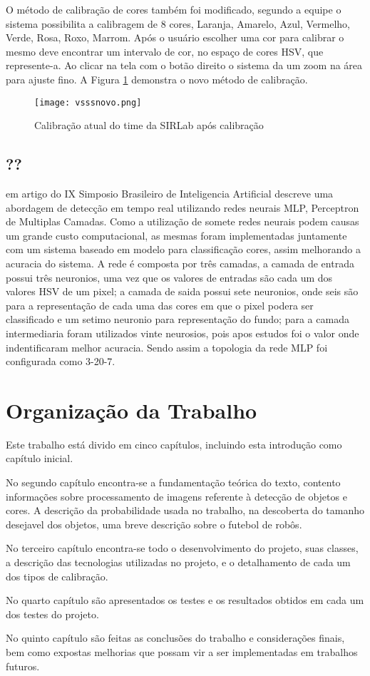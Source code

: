 O método de calibração de cores também foi modificado, segundo a equipe\cite{VSSVision} o sistema possibilita a calibragem de 8 cores, Laranja, Amarelo, Azul, Vermelho, Verde, Rosa, Roxo, Marrom. Após o usuário escolher uma cor para calibrar o mesmo deve encontrar um intervalo de cor, no espaço de cores HSV, que represente-a. Ao clicar na tela com o botão direito o sistema da um zoom na área para ajuste fino. A Figura \ref{SIRLabNovaCalibracao} demonstra o novo método de calibração.

\begin{figure}[!h]
	\centering
	\texttt{[image: vsssnovo.png]} 	
	\caption{Calibração atual do time da SIRLab \cite{VSSVision} após calibração}
	\label{SIRLabNovaCalibracao}
\end{figure}

\subsection{??}
\cite{Neura:2009} em artigo do IX Simposio Brasileiro de Inteligencia Artificial descreve uma abordagem de detecção em tempo real utilizando redes neurais MLP, Perceptron de Multiplas Camadas. Como a utilização de somete redes neurais podem causas um grande custo computacional, as mesmas foram implementadas juntamente com um sistema baseado em modelo para classificação cores, assim melhorando a acuracia do sistema.
A rede é composta por três camadas, a camada de entrada possui três neuronios, uma vez que os valores de entradas são cada um dos valores HSV de um pixel; a camada de saida possui sete neuronios, onde seis são para a representação de cada uma das cores em que o pixel podera ser classificado e um setimo neuronio para representação do fundo; para a camada intermediaria foram utilizados vinte neurosios, pois apos estudos foi o valor onde indentificaram melhor acuracia. Sendo assim a topologia da rede MLP foi configurada como  3-20-7.


\section{Organização da Trabalho} \label{Sec:Organizacao}

Este trabalho está divido em cinco capítulos, incluindo esta introdução como capítulo inicial.

No segundo capítulo encontra-se a fundamentação teórica do texto, contento informaç\~oes sobre processamento de imagens referente à detecção de objetos e cores. A descrição da probabilidade usada no trabalho, na descoberta do tamanho desejavel dos objetos, uma breve descrição sobre o futebol de robôs. 

No terceiro capítulo encontra-se todo o desenvolvimento do projeto, suas classes, a descrição das tecnologias utilizadas no projeto, e o detalhamento de cada um dos tipos de calibração.

No quarto capítulo são apresentados os testes e os resultados obtidos em cada um dos testes do projeto.

No quinto capítulo são feitas as conclusões do trabalho e considerações finais, bem como expostas melhorias que possam vir a ser implementadas em trabalhos futuros.
